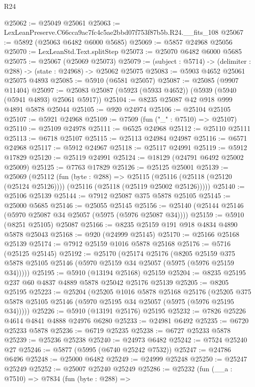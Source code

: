 \begin{lexlean}{R24}
\begin{coremodule}
@25062 := @25049 @25061
@25063 := LexLeanPreserve.C66cca9ac7fc4c5ae2bbd07f753f87b5b.R24.__fits_108
@25067 := @5892 (@25063 @6482 @6000 @5685)
@25069 := @5857 @24968 @25056
@25070 := LexLeanStd.Text.splitStep
@25073 := @25070 @6482 @6000 @5685
@25075 := @25067 (@25069 @25073)
@25079 := (subject : @5714) -> (delimiter : @288) -> (state : @24968) -> @25062 @25075
@25083 := @5903 @4652 @25061 @25075 @4893
@25085 := @5910 (@6581 @25057)
@25087 := @25085 (@9907 @11404)
@25097 := @25083 @25087 (@5923 (@5933 @4652)) (@5939 (@5940 (@5941 @4893) @25061 @5917))
@25104 := @8235 @25087 @42 @918 @999 @4891 @5878 @25044
@25105 := @920 @24974
@25106 := @25104 @25105
@25107 := @5921 @24968
@25109 := @7509 (fun ("_" : @7510) => @25107)
@25110 := @25109 @24978
@25111 := @6525 @24968
@25112 := @25110 @25111
@25113 := @6718 @25107
@25115 := @25113 @24984 @24987
@25116 := @6571 @24968
@25117 := @5912 @24967
@25118 := @25117 @24991
@25119 := @5912 @17829
@25120 := @25119 @24991
@25124 := @18129 (@24791 @6492 @25002 @25009)
@25125 := @7763 @17829
@25126 := @25125 @25001
@25139 := @25069
    (@25112
      (fun (byte : @288) =>
      @25115 (@25116 (@25118 (@25120 (@25124 @25126)))) (@25116 (@25118 (@25119 @25002 @25126)))))
@25140 := @25106 @25139
@25144 := @7912 @25087 @375 @5878 @25105
@25145 := @25000 @5685
@25146 := @25055 @25145
@25156 := @25140 (@25144 @25146 (@5970 @25087 @34 @25057 (@5975 (@5976 @25087 @34))))
@25159 := @5910 (@8251 @25105) @25087
@25166 := @8235 @25159 @191 @918 @4834 @4890 @5878 @25043
@25168 := @920 (@24999 @25145)
@25170 := @25166 @25168 @25139
@25174 := @7912 @25159 @1016 @5878 @25168
@25176 := @5716 (@25125 @25145)
@25192 := @25170
    (@25174
      @25176
      (@8205 @25159 @375 @5878 @25105 @25146 (@5970 @25159 @34 @25057 (@5975 (@5976 @25159 @34)))))
@25195 := @5910 (@13194 @25168) @25159
@25204 := @8235 @25195 @237 @60 @4837 @4889 @5878 @25042 @25176 @25139
@25205 := @8205 @25195
@25223 := @25204
    (@25205
      @1016
      @5878
      @25168
      @25176
      (@25205 @375 @5878 @25105 @25146 (@5970 @25195 @34 @25057 (@5975 (@5976 @25195 @34)))))
@25226 := @5910 (@13191 @25176) @25195
@25232 := @7826 @25226 @4614 @4841 @4888 @24976 @6280
@25233 := @24981 @6492
@25235 := @6720 @25233 @5878
@25236 := @6719 @25235
@25238 := @6727 @25233 @5878
@25239 := @25236 @25238
@25240 := @24973 @6482
@25242 := @7524 @25240 @27
@25246 := @5877 (@5995 (@6740 @25242 @7532))
@25247 := @24786 @6496
@25248 := @25000 @6482
@25249 := @24999 @25248
@25250 := @25247 @25249
@25252 := @25007 @25240 @25249
@25286 := @25232
    (fun (__a : @7510) =>
    @7834
      (fun (byte : @288) =>

\end{coremodule}
\end{lexlean}
